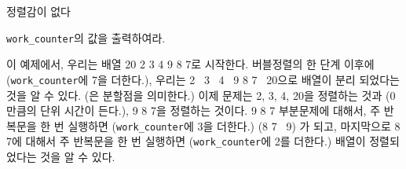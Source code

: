 \begin{problem}{정렬감이 없다}
	\OutputFile
	
	\texttt{work\_counter}의 값을 출력하여라.
	
	\Constraints
		
	\begin{example}
	\end{example}
	
	\Note
	
	이 예제에서, 우리는 배열 20 2 3 4 9 8 7로 시작한다. 버블정렬의 한 단계 이후에 (\texttt{work\_counter}에 7을 더한다.), 우리는 2 \textbar\ 3 \textbar\ 4 \textbar\ 9 8 7 \textbar\  20으로 배열이 분리 되었다는 것을 알 수 있다. (\textbar 은 분할점을 의미한다.) 이제 문제는 2, 3, 4, 20을 정렬하는 것과 (0만큼의 단위 시간이 든다.), 9 8 7을 정렬하는 것이다. 9 8 7 부분문제에 대해서, 주 반복문을 한 번 실행하면 (\texttt{work\_counter}에 3을 더한다.) (8 7 \textbar\  9) 가 되고, 마지막으로 8 7에 대해서 주 반복문을 한 번 실행하면 (\texttt{work\_counter}에 2를 더한다.) 배열이 정렬되었다는 것을 알 수 있다.
	
	
	
\end{problem}

